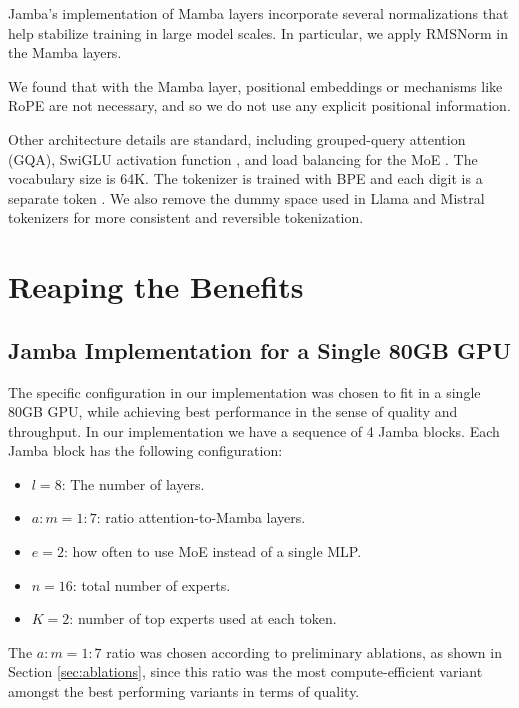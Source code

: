 \documentclass{article}
\def\jamba{Jamba\xspace}
\begin{document}
\jamba's implementation of Mamba layers incorporate several normalizations that help stabilize training in large model scales. In particular, we apply RMSNorm \cite{zhang2019root} in the Mamba layers. 

We found that with the Mamba layer, positional embeddings or mechanisms like RoPE \cite{su2024roformer} are not necessary, and so we do not use any explicit positional information. 

Other architecture details are standard, including grouped-query attention (GQA), SwiGLU activation function \cite{shazeer2020glu,chowdhery2023palm,touvron2023llama}, and load balancing for the MoE \cite{fedus2022switch}. The vocabulary size is 64K. The tokenizer is trained with BPE \cite{gage1994new,sennrich2016neural,mielke2021between} and each digit is a separate token \cite{chowdhery2023palm}.  We also remove the dummy space used in Llama and Mistral tokenizers for more consistent and reversible tokenization.



\section{Reaping the Benefits}

\subsection{Jamba Implementation for a Single 80GB GPU} \label{sec:impl-single-gpu}

The specific configuration in our implementation was chosen to fit in a single 80GB GPU, while achieving best performance in the sense of quality and throughput. In our implementation we have a sequence of 4 Jamba blocks. Each Jamba block has the following configuration:
\begin{itemize}
\item $l = 8$: The number of layers.
\item $a:m = 1:7$: ratio attention-to-Mamba layers.
\item $e = 2$: how often to use MoE instead of a single MLP. 
\item $n = 16$: total number of experts. 
\item $K = 2$: number of top experts used at each token. 
\end{itemize}

The $a:m = 1:7$ ratio was chosen according to preliminary ablations, as shown in Section \ref{sec:ablations}, since this ratio was the most compute-efficient variant amongst the best performing variants in terms of quality.
\end{document}
